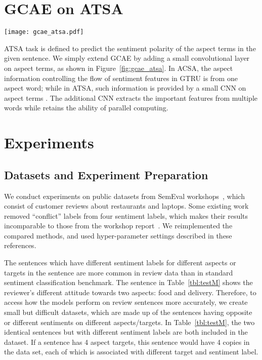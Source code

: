 \documentclass[11pt,a4paper]{article}
\begin{document}
\section{GCAE on ATSA}
\begin{figure*}
\centering
  \texttt{[image: gcae\_atsa.pdf]}
\caption{Illustration of model GCAE for ATSA task. It has an additional convolutional layer on aspect terms.}
\label{fig:gcae_atsa}
\end{figure*}

ATSA task is defined to predict the sentiment polarity of the aspect terms in the given sentence.
We simply extend GCAE by adding a small convolutional layer on aspect terms, as shown in Figure~\ref{fig:gcae_atsa}. In ACSA, the aspect information controlling the flow of sentiment features in GTRU is from one aspect word; while in ATSA, such information  is provided by a small CNN on aspect terms . The additional CNN extracts the important features from multiple words while retains the ability of parallel computing. 

\section{Experiments}

\subsection{Datasets and Experiment Preparation}
We conduct experiments on public datasets from SemEval workshops~\cite{Pontiki:2014ex}, which consist of customer reviews about restaurants and laptops. 
Some existing work~\cite{Wang:2016tf,Ma:2017jo,Chen:2017wv} removed ``conflict'' labels from four sentiment labels, which makes their results incomparable to those from the workshop report~\cite{Kiritchenko:2014jw}.  We reimplemented the compared methods, and used hyper-parameter settings described in these references.

The sentences which have different sentiment labels for different aspects or targets in the sentence are more common in review data than in standard sentiment classification benchmark. The sentence in Table~\ref{tbl:testM} shows the reviewer's different attitude towards two aspects: food and delivery. Therefore, to access how the models perform on review sentences more accurately, we create small but difficult datasets, which are made up of the sentences having opposite or different sentiments on different aspects/targets. In Table~\ref{tbl:testM}, the two identical sentences but with different sentiment labels are both included in the dataset. If a sentence has 4 aspect targets, this sentence would have 4 copies in the data set, each of which is associated with different target and sentiment label.  
\end{document}
